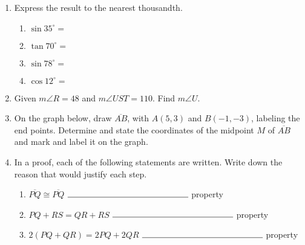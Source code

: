 \documentclass[12pt, oneside]{article}
\begin{document}
\begin{enumerate}
\newpage

    \item Express the result to the nearest thousandth.  \vspace{1cm}

      \begin{multicols}{2}
        \begin{enumerate}
          \item $\sin 35^\circ = $ \vspace{1cm}
          \item $\tan 70^\circ =$
          \item $\sin 78^\circ = $ \vspace{1cm}
          \item $\cos 12^\circ =$

        \end{enumerate}
      \end{multicols} \vspace{1cm}

  \item Given $m\angle R=48$ and $m\angle UST=110$. Find $m\angle U$.\\[1cm]
    \vspace{2cm}


  \item On the graph below, draw $\overline{AB}$, with $A(5,3)$ and $B(-1,-3)$, labeling the end points. Determine and state the coordinates of the midpoint $M$ of $\overline{AB}$ and mark and label it on the graph.\\
    \vspace{1cm}

  \item In a proof, each of the following statements are written. Write down the reason that would justify each step. \bigskip
    \begin{enumerate}
      \item $\overline{PQ} \cong \overline{PQ}$ \hspace{4cm} $\rule{5cm}{0.15mm}$ property \bigskip
      \item $PQ+RS= QR+RS$  \hspace{1.7cm} $\rule{5cm}{0.15mm}$ property  \bigskip
      \item $2(PQ + QR)=2PQ+2QR$  \hspace{0.6cm} $\rule{5cm}{0.15mm}$ property
    \end{enumerate}


\end{enumerate}
\end{document}

